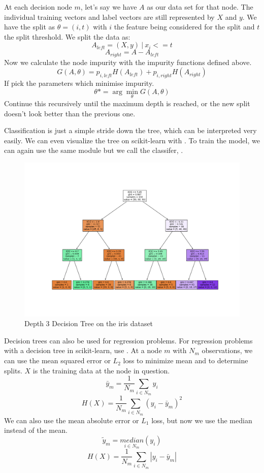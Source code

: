 \documentclass{article}
\newcommand{\code}[1]{{\fontfamily{zi4} \selectfont{#1}}}
\begin{document}
At each decision node $m$, let's say we have $A$ as our data set for that node. The individual training vectors and label vectors are still represented by $X$ and $y$. We have the split as $\theta = (i, t)$ with $i$ the feature being considered for the split and $t$ the split threshold. We split the data as:
$$A_{left} = (X, y) \ |\  x_i <= t$$
$$A_{right} = A - A_{left}$$
Now we calculate the node impurity with the impurity functions defined above.
$$G(A, \theta) = p_{i, left}H(A_{left}) + p_{i, right}H(A_{right})$$
If pick the parameters which minimise impurity.
$$\theta *  = \arg \min _{\theta} G(A, \theta)$$
Continue this recursively until the maximum depth is reached, or the new split doesn't look better than the previous one.

Classification is just a simple stride down the tree, which can be interpreted very easily. We can even visualize the tree on scikit-learn with \code{sklearn.tree.plot\_tree(model)}. To train the model, we can again use the same module but we call the classifer, \code{sklearn.tree.DecisionTreeClassifier()}. 

\begin{figure}[H]
\includegraphics[width=\linewidth]{Images/tree_small.png}
\centering
\caption{Depth 3 Decision Tree on the iris dataset}
\end{figure}

Decision trees can also be used for regression problems. For regression problems with a decision tree in scikit-learn, use \code{sklearn.tree.DecisionTreeRegressor()}. At a node $m$ with $N_m$ observations, we can use the mean squared error or $L_2$ loss to minimize mean and to determine splits. $X$ is the training data at the node in question. 
$$\bar{y}_m = \frac{1}{N_m} \sum_{i \in N_m} y_i$$
$$H(X) = \frac{1}{N_m} \sum_{i \in N_m} (y_i - \bar{y}_m)^2$$
We can also use the mean absolute error or $L_1$ loss, but now we use the median instead of the mean.
$$\tilde{y}_m =  \underset{i \in N_m}{median} (y_i)$$
$$H(X) = \frac{1}{N_m} \sum_{i \in N_m} |y_i - \bar{y}_m|$$
\end{document}
